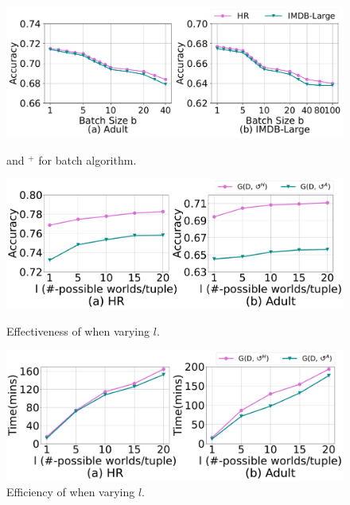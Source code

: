  \begin{figure}   
	\centering
	\begin{minipage}[t]{0.32\textwidth}
		\centering
		\includegraphics[width=\columnwidth]{figs/batch}
		\vspace{-2.5em}
		\caption{\ours and \ours$^+$ for batch algorithm.}
		\label{fig:batchalg}
	\end{minipage}
	\begin{minipage}[t]{0.32\textwidth}
		\centering
		\includegraphics[width=\columnwidth]{figs/vary_l_effectiveness}
		\vspace{-2.5em}
		\caption{Effectiveness of \ours when varying $l$.}
		\label{fig:vary_l_effect}
	\end{minipage}
	\begin{minipage}[t]{0.32\textwidth}
		\centering
		\includegraphics[width=\columnwidth]{figs/vary_l_efficiency}
		\vspace{-2.5em}
		\caption{Efficiency of \ours when varying $l$.}
		\label{fig:vary_l_efficient}
	\end{minipage}
\end{figure}

